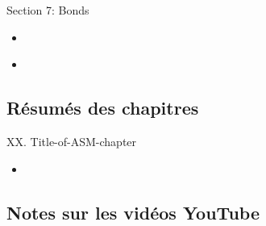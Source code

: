 \begin{ASM_chapter}
Section 7: Bonds
\begin{itemize}
	\item	{}
\end{itemize}
\end{ASM_chapter}

\begin{YTB_vids}
\begin{itemize}
	\item	
\end{itemize}
\end{YTB_vids}

\subsection{Résumés des chapitres}

\begin{CHPT_SUMM_AUTO}[label = {L.-XX}]{XX. Title-of-ASM-chapter}
	\begin{itemize}
		\item	
	\end{itemize}
\end{CHPT_SUMM_AUTO}

\subsection{Notes sur les vidéos YouTube}

